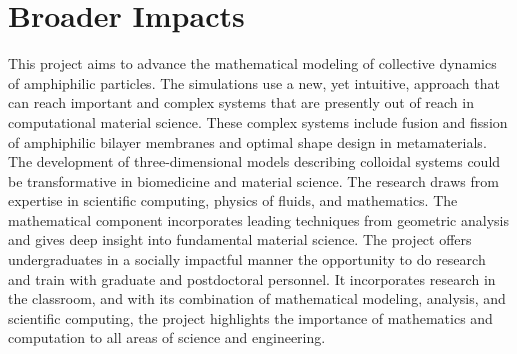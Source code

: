 \section{Broader Impacts}
\label{sec:BroaderImpacts}

This project aims to advance the mathematical modeling of collective 
dynamics of amphiphilic particles. The simulations use a new, yet intuitive,
approach that can reach important and complex systems that are presently out of 
reach in computational material science. These complex systems include 
fusion and fission of amphiphilic bilayer membranes and optimal shape design
in metamaterials. The development of three-dimensional 
models describing colloidal systems could be transformative in biomedicine
and material science. The research draws from expertise in scientific 
computing, physics of fluids, and mathematics. The mathematical component 
incorporates leading techniques from geometric analysis and gives deep insight 
into fundamental material science. The project offers undergraduates 
in a socially impactful manner the opportunity to do research and train 
with graduate and postdoctoral personnel. It incorporates research in the 
classroom, and with its combination of mathematical modeling, analysis, 
and scientific computing, the project highlights the importance of 
mathematics and computation to all areas of science and engineering.


